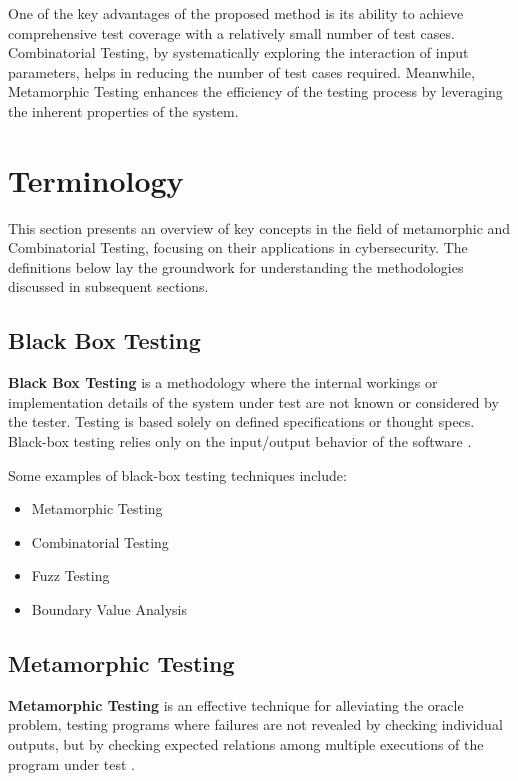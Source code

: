 One of the key advantages of the proposed method is its ability to achieve comprehensive test coverage with a relatively small number of test cases.
Combinatorial Testing, by systematically exploring the interaction of input parameters, helps in reducing the number of test cases required.
Meanwhile, Metamorphic Testing enhances the efficiency of the testing process by leveraging the inherent properties of the system.


\section{Terminology}\label{sec:terminology}

This section presents an overview of key concepts in the field of metamorphic and Combinatorial Testing, focusing on their applications in cybersecurity.
The definitions below lay the groundwork for understanding the methodologies discussed in subsequent sections.

\subsection{Black Box Testing}\label{subsec:black-box-testing}

\textbf{Black Box Testing} is a methodology where the internal workings or implementation details of the system under test are not known or considered by the tester.
Testing is based solely on defined specifications or thought specs.
Black-box testing relies only on the input/output behavior of the software \cite{Testing}.

Some examples of black-box testing techniques include:
\begin{itemize}
    \item Metamorphic Testing
    \item Combinatorial Testing
    \item Fuzz Testing
    \item Boundary Value Analysis
\end{itemize}

\subsection{Metamorphic Testing}\label{subsec:metamorphic-testing}

\textbf{Metamorphic Testing} is an effective technique for alleviating the oracle problem, testing  programs where failures are not revealed by checking individual outputs, but by checking expected relations among multiple executions of the program under test \cite{CybersecurityMT}.


